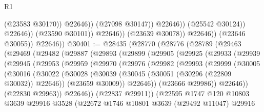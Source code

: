\begin{lexlean}{R1}
\begin{coremodule}
                                        (@23583 @30170))
                                      @22646))
                                  (@27098 @30147))
                                @22646))
                            (@25542 @30124))
                          @22646))
                      (@23590 @30101))
                    @22646))
                (@23639 @30078))
              @22646))
          (@23646 @30055))
        @22646))
@30401 := @28435
    (@28770
      (@28776
        (@28789
          (@29463
            (@29469
              (@29482
                (@29887
                  (@29893
                    (@29899
                      (@29905
                        (@29925
                          (@29933
                            (@29939
                              (@29945
                                (@29953
                                  (@29959
                                    (@29970
                                      (@29976
                                        (@29982
                                          (@29993
                                            (@29999
                                              (@30005
                                                (@30016
                                                  (@30022
                                                    (@30028
                                                      (@30039
                                                        (@30045
                                                          (@30051 (@30296 (@22809 @30032)) @22646))
                                                        (@23659 @30009))
                                                      @22646))
                                                  (@23666 @29986))
                                                @22646))
                                            (@22830 @29963))
                                          @22646))
                                      (@22837 @29911))
                                    (@22595
                                      @1747
                                      @120
                                      @10803
                                      @3639
                                      @29916
                                      @3528
                                      (@22672
                                        @1746
                                        @10801
                                        @3639
                                        (@29492 @11047)
                                        @29916

\end{coremodule}
\end{lexlean}
